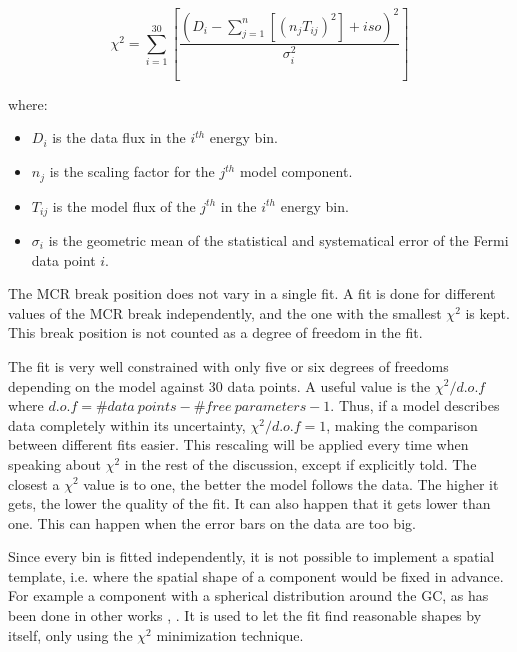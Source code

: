\begin{equation}
\chi^2 = \sum_{i=1}^{30} \left[ \frac{ \left( D_i - \sum_{j=1}^{n} \left[ (n_jT_{ij})^2 \right] + iso \right) ^2}{\sigma_i^2} \right]
\end{equation}

where:
\begin{itemize}
\item $D_i$ is the data flux in the $i^{th}$ energy bin.
\item $n_j$ is the scaling factor for the $j^{th}$ model component.
\item $T_{ij}$ is the model flux of the $j^{th}$ in the $i^{th}$ energy bin.
\item $\sigma_i$ is the geometric mean of the statistical and systematical error of the Fermi data point $i$.
\end{itemize}

The MCR break position does not vary in a single fit. A fit is done for different values of the MCR break independently, and the one with the smallest $\chi^2$ is kept. This break position is not counted as a degree of freedom in the fit.

The fit is very well constrained with only five or six degrees of freedoms depending on the model against 30 data points. A useful value is the $\chi^2 / d.o.f$ where $d.o.f = \#data\ points - \#free\ parameters - 1$. Thus, if a model describes data completely within its uncertainty, $\chi^2 / d.o.f = 1$, making the comparison between different fits easier. This rescaling will be applied every time when speaking about $\chi^2$ in the rest of the discussion, except if explicitly told. 
The closest a $\chi^2$ value is to one, the better the model follows the data. The higher it gets, the lower the quality of the fit. It can also happen that it gets lower than one. This can happen when the error bars on the data are too big.


Since every bin is fitted independently, it is not possible to implement a spatial template, i.e. where the spatial shape of a component would be fixed in advance. For example a component with a spherical distribution around the GC, as has been done in other works \cite{Calore2015}, \cite{Daylan2016}. It is used to let the fit find reasonable shapes by itself, only using the $\chi^2$ minimization technique.


